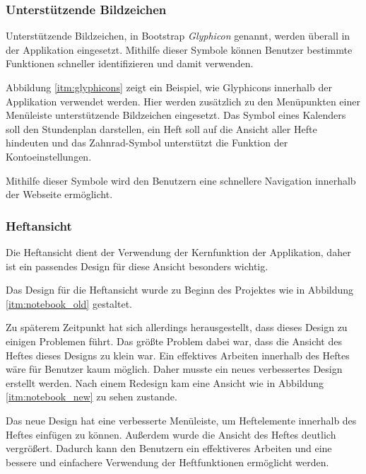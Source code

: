 \subsubsection{Unterstützende Bildzeichen}
Unterstützende Bildzeichen, in Bootstrap \textit{Glyphicon} genannt, werden überall in der Applikation eingesetzt. Mithilfe dieser Symbole können Benutzer bestimmte Funktionen schneller identifizieren und damit verwenden.


Abbildung \ref{itm:glyphicons} zeigt ein Beispiel, wie Glyphicons innerhalb der Applikation verwendet werden. Hier werden zusätzlich zu den Menüpunkten einer Menüleiste unterstützende Bildzeichen eingesetzt. Das Symbol eines Kalenders soll den Stundenplan darstellen, ein Heft soll auf die Ansicht aller Hefte hindeuten und das Zahnrad-Symbol unterstützt die Funktion der Kontoeinstellungen.

Mithilfe dieser Symbole wird den Benutzern eine schnellere Navigation innerhalb der Webseite ermöglicht.

\subsubsection{Heftansicht}
Die Heftansicht dient der Verwendung der Kernfunktion der Applikation, daher ist ein passendes Design für diese Ansicht besonders wichtig.

Das Design für die Heftansicht wurde zu Beginn des Projektes wie in Abbildung \ref{itm:notebook_old} gestaltet.


Zu späterem Zeitpunkt hat sich allerdings herausgestellt, dass dieses Design zu einigen Problemen führt. Das größte Problem dabei war, dass die Ansicht des Heftes dieses Designs zu klein war. Ein effektives Arbeiten innerhalb des Heftes wäre für Benutzer kaum möglich. Daher musste ein neues verbessertes Design erstellt werden. Nach einem Redesign kam eine Ansicht wie in Abbildung \ref{itm:notebook_new} zu sehen zustande.


Das neue Design hat eine verbesserte Menüleiste, um Heftelemente innerhalb des Heftes einfügen zu können. Außerdem wurde die Ansicht des Heftes deutlich vergrößert. Dadurch kann den Benutzern ein effektiveres Arbeiten und eine bessere und einfachere Verwendung der Heftfunktionen ermöglicht werden.
